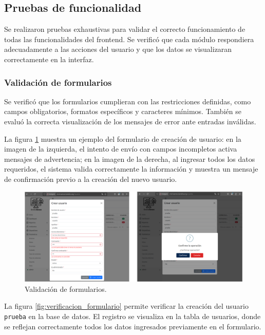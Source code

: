 \subsection{Pruebas de funcionalidad}

Se realizaron pruebas exhaustivas para validar el correcto funcionamiento de
todas las funcionalidades del frontend. Se verificó que cada módulo respondiera
adecuadamente a las acciones del usuario y que los datos se visualizaran
correctamente en la interfaz.

\subsubsection{Validación de formularios}

Se verificó que los formularios cumplieran con las restricciones definidas,
como campos obligatorios, formatos específicos y caracteres mínimos. También se
evaluó la correcta visualización de los mensajes de error ante entradas
inválidas.

La figura \ref{fig:formulario} muestra un ejemplo del formulario de creación de
usuario: en la imagen de la izquierda, el intento de envío con campos
incompletos activa mensajes de advertencia; en la imagen de la derecha, al
ingresar todos los datos requeridos, el sistema valida correctamente la
información y muestra un mensaje de confirmación previo a la creación del nuevo
usuario.

\begin{figure}[H]
    \centering
    \includegraphics[width=\textwidth]{Images/44_formulario.png}
    \caption[Validación de formularios]{Validación de formularios.}
    \label{fig:formulario}
\end{figure}

La figura \ref{fig:verificacion_formulario} permite verificar la creación del
usuario \texttt{prueba} en la base de datos. El registro se visualiza en la
tabla de usuarios, donde se reflejan correctamente todos los datos ingresados
previamente en el formulario.

